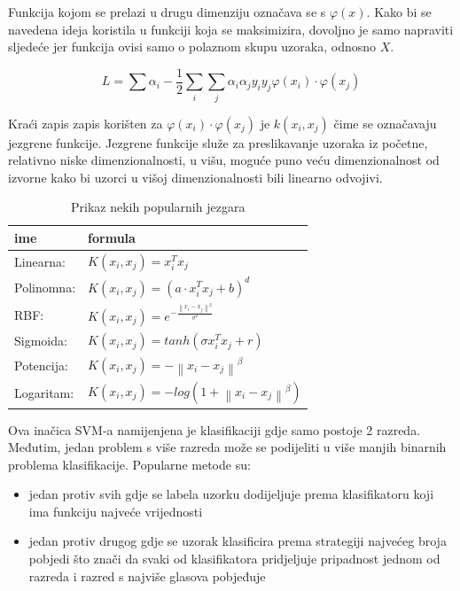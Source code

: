 \documentclass[times, utf8, zavrsni]{fer}
\begin{document}
\bigbreak

Funkcija kojom se prelazi u drugu dimenziju označava se s \(\varphi(x)\). Kako bi se navedena ideja
koristila u funkciji koja se maksimizira, dovoljno je samo napraviti sljedeće
jer funkcija ovisi samo o polaznom skupu uzoraka, odnosno \(X\).

\[
L = \sum \alpha_i - \frac{1}{2} \sum_i \sum_j \alpha_i \alpha_j y_i y_j \varphi(x_i) \cdot \varphi(x_j)
\]

Kraći zapis zapis korišten za \(\varphi(x_i) \cdot \varphi(x_j)\) je \(k(x_i, x_j)\) čime se označavaju 
jezgrene funkcije. Jezgrene funkcije služe za preslikavanje uzoraka iz početne, relativno niske 
dimenzionalnosti, u višu, moguće puno veću dimenzionalnost od izvorne kako bi uzorci u višoj 
dimenzionalnosti bili linearno odvojivi.

\begin{table}[htbp]
\centering
\caption{Prikaz nekih popularnih jezgara}
\begin{tabular}{ll}
\hline
ime & formula \\ \hline
Linearna: & \(K\left( x_i, x_j\right) = x_i^Tx_j\) \\
Polinomna: & \(K\left( x_i, x_j\right) = \left( a \cdot x_i^Tx_j + b\right)^d\)  \\
RBF: & \(K\left( x_i, x_j\right) = e^{-\frac{\left\lVert x_i - x_j \right\rVert^2}{\sigma^2}}\) \\
Sigmoida: & \(K(x_i, x_j) = tanh\left( \sigma x_i^T x_j + r\right)\) \\
Potencija: & \(K\left( x_i, x_j\right) = -\left\lVert x_i - x_j\right\rVert^\beta\) \\
Logaritam: & \(K\left( x_i, x_j\right) = -log\left( 1 + \left\lVert x_i - x_j\right\rVert^\beta\right)\) 
\end{tabular}
\end{table}

\newpage

Ova inačica SVM-a namijenjena je klasifikaciji gdje samo postoje 2 razreda. Međutim, 
jedan problem s više razreda može se podijeliti u više manjih binarnih problema klasifikacije. 
Popularne metode su: 

\begin{itemize}
	\item jedan protiv svih gdje se labela uzorku dodijeljuje prema klasifikatoru koji 
	ima funkciju najveće vrijednosti 
	\item jedan protiv drugog gdje se uzorak klasificira prema strategiji najvećeg 
	broja pobjedi što znači da svaki od klasifikatora pridjeljuje pripadnost jednom od razreda i razred s najviše glasova pobjeđuje
\end{itemize}
\end{document}

